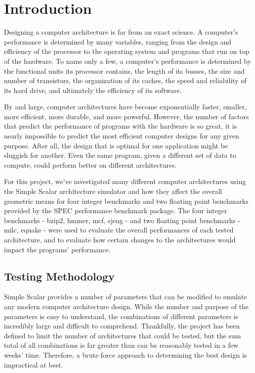 \documentclass[paper=a4, fontsize=12pt]{scrartcl} %
\numberwithin{equation}{section} %
\numberwithin{figure}{section} %
\numberwithin{table}{section} %
\begin{document}
\tableofcontents


\section{Introduction}

Designing a computer architecture is far from an exact science. A computer's performance is determined by many variables, ranging from the design and efficiency of the processor to the operating system and programs that run on top of the hardware. To name only a few, a computer's performance is determined by the functional units its processor contains, the length of its busses, the size and number of transistors, the organization of its caches, the speed and reliability of its hard drive, and ultimately the efficiency of its software.

By and large, computer architectures have become exponentially faster, smaller, more efficient, more durable, and more powerful. However, the number of factors that predict the performance of programs with the hardware is so great, it is nearly impossible to predict the most efficient computer designs for any given purpose. After all, the design that is optimal for one application might be sluggish for another. Even the same program, given a different set of data to compute, could perform better on different architectures.

For this project, we've investigated many different computer architectures using the Simple Scalar architecture simulator and how they affect the overall geometric means for four integer benchmarks and two floating point benchmarks provided by the SPEC performance benchmark package. The four integer benchmarks - bzip2, hmmer, mcf, sjeng - and two floating point benchmarks - milc, equake - were used to evaluate the overall performances of each tested architecture, and to evaluate how certain changes to the architectures would impact the programs' performance.


\subsection{Testing Methodology}

Simple Scalar provides a number of parameters that can be modified to emulate any modern computer architecture design. While the number and purpose of the parameters is easy to understand, the combinations of different parameters is incredibly large and difficult to comprehend. Thankfully, the project has been defined to limit the number of architectures that could be tested, but the sum total of all combinations is far greater than can be reasonably tested in a few weeks' time. Therefore, a brute force approach to determining the best design is impractical at best.
\end{document}
